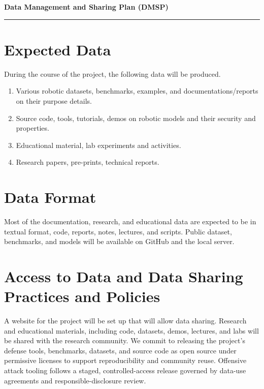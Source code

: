 
{\Large\bfseries\filcenter
Data Management and Sharing Plan (DMSP)
\\\rule{\textwidth}{0.4pt}}

\setcounter{section}{0}
\section{Expected Data}

During the course of the project, the following data will be produced.
\begin{enumerate}
    \item Various robotic datasets, benchmarks, examples, and documentations/reports on their purpose details.
    \item Source code, tools, tutorials, demos on robotic models and their security and properties.
    \item Educational material, lab experiments and activities.
    \item Research papers, pre-prints, technical reports.
\end{enumerate}

\section{Data Format}

Most of the documentation, research, and educational data are expected to be in textual format, \eg code, reports, notes, lectures, and scripts. 
Public dataset, benchmarks, and models will be available on GitHub and the local server. 

\section{Access to Data and Data Sharing Practices and Policies}

A website for the project will be set up that will allow data sharing. Research and educational materials, including code, datasets, demos, lectures, and labs will be shared with the research community. 
We commit to releasing the project's defense tools, benchmarks, datasets, and source code as open source under permissive licenses to support reproducibility and community reuse.
Offensive attack tooling follows a staged, controlled-access release governed by data-use agreements and responsible-disclosure review. %

